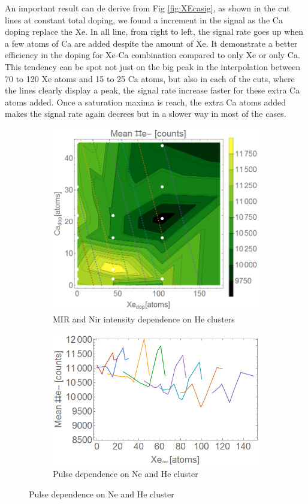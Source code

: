 An important result can de derive from Fig \ref{fig:XEcasig}, as shown in the cut lines at constant total doping, we found a increment in the signal as the Ca doping replace the Xe. In all line, from right to left, the signal rate goes up when a few atoms of Ca are added despite the amount of Xe. It demonstrate a better efficiency in the doping for Xe-Ca combination compared to only Xe or only Ca. This tendency can be spot not just on the big peak in the interpolation between 70 to 120 Xe atoms and 15 to 25 Ca atoms, but also in each of the cuts, where the lines clearly display a peak, the signal rate increase faster for these extra Ca atoms added. Once a saturation maxima is reach, the extra Ca atoms added makes the signal rate again decrees but in a slower way in most of the cases. 

\begin{figure}[h!]
\hfill
\begin{subfigure}[l]{0.48\textwidth}
\caption{MIR and Nir intensity dependence on He clusters}
\includegraphics[width=1\textwidth]{../Images/results/MIR_He_XeCaDop/interpolationElectr.png} 
\end{subfigure} 
\begin{subfigure}[l]{0.48\textwidth}
\caption{Pulse dependence on Ne and He cluster}
\includegraphics[width=1\textwidth]{../Images/results/MIR_He_XeCaDop/interpolationEleclines.png} 

\end{subfigure}
\end{figure}
